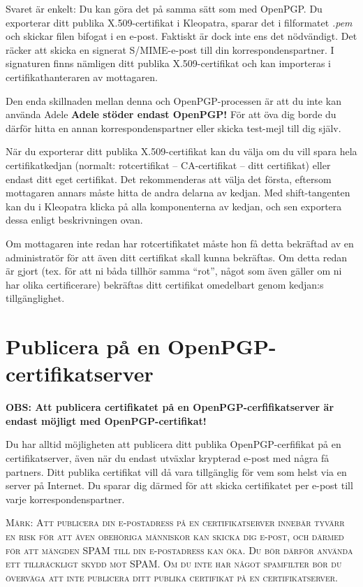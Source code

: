 \documentclass[a4paper,11pt, oneside,openright,titlepage,dvips]{scrbook}
\newcommand\margin[1]{\marginline {\sffamily\scriptsize #1}}
\newcommand{\IncludeImage}[2][]{\texorhtml{%
\texttt{[image: \#2]}%
}{%
\htmlimg{#2.png}%
}}
\newcounter{part}
\newcounter{chapter}
\newcounter{section}[chapter]
\begin{document}
Svaret är enkelt: Du kan göra det på samma sätt som med OpenPGP. Du exporterar
ditt publika X.509-certifikat i Kleopatra, sparar det i filformatet
\textit{.pem} och skickar filen bifogat i en e-post.
Faktiskt är dock inte ens det nödvändigt. Det räcker att skicka en
signerat S/MIME-e-post till din korrespondenspartner. I signaturen 
finns nämligen ditt publika X.509-certifikat och kan importeras i 
certifikathanteraren av mottagaren.

Den enda skillnaden mellan denna och OpenPGP-processen är att du inte
kan använda Adele \textbf{Adele stöder endast OpenPGP!} 
För att öva dig borde du därför hitta en annan korrespondenspartner
eller skicka test-mejl till dig själv.

När du exporterar ditt publika X.509-certifikat kan du välja om du vill
spara hela certifikatkedjan (normalt: rotcertifikat -- CA-certifikat --
ditt certifikat) eller endast ditt eget certifikat. Det rekommenderas att
välja det första, eftersom mottagaren annars måste hitta de andra delarna
av kedjan. Med shift-tangenten kan du i Kleopatra klicka på alla komponenterna 
av kedjan, och sen exportera dessa enligt beskrivningen ovan.

Om mottagaren inte redan har rotcertifikatet måste hon få detta
bekräftad av en administratör för att även ditt certifikat skall
kunna bekräftas. Om detta redan är gjort (tex. för att ni båda
tillhör samma "`rot"', något som även gäller om ni har olika
certificerare) bekräftas ditt certifikat omedelbart genom kedjan:s
tillgänglighet.


\clearpage
\section{Publicera på en OpenPGP-certifikatserver}
\label{sec_publishPerKeyserver}

\textbf{OBS: Att publicera certifikatet på en OpenPGP-cerfifikatserver
är endast möjligt med OpenPGP-certifikat!}
\T\margin{\IncludeImage[width=1.5cm]{openpgp-icon}}

Du har alltid möjligheten att publicera ditt publika OpenPGP-cerfifikat
på en certifikatserver, även när du endast utväxlar krypterad e-post med
några få partners. Ditt publika certifikat vill då vara tillgänglig för
vem som helst via en server på Internet. Du sparar dig därmed för att
skicka certifikatet per e-post till varje korrespondenspartner.

\textsc{Märk: Att publicera din e-postadress på en certifikatserver
innebär tyvärr en risk för att även obehöriga människor kan skicka
dig e-post, och därmed för att mängden SPAM till din e-postadress kan
öka. Du bör därför använda ett tillräckligt skydd mot SPAM. Om du inte
har något spamfilter bör du överväga att inte publicera ditt publika
certifikat på en certifikatserver.}
\end{document}
